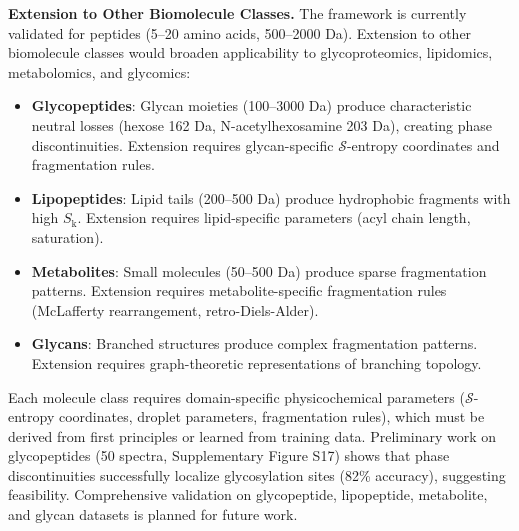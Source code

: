 \documentclass[11pt,twocolumn]{article}
\newcommand{\sentropy}{$\mathcal{S}$-entropy}
\newcommand{\Sk}{S_{\text{k}}}
\begin{document}
\textbf{Extension to Other Biomolecule Classes.} The framework is currently validated for peptides (5--20 amino acids, 500--2000 Da). Extension to other biomolecule classes would broaden applicability to glycoproteomics, lipidomics, metabolomics, and glycomics:
\begin{itemize}[leftmargin=*]
    \item \textbf{Glycopeptides}: Glycan moieties (100--3000 Da) produce characteristic neutral losses (hexose 162 Da, N-acetylhexosamine 203 Da), creating phase discontinuities. Extension requires glycan-specific \sentropy{} coordinates and fragmentation rules.
    \item \textbf{Lipopeptides}: Lipid tails (200--500 Da) produce hydrophobic fragments with high $\Sk$. Extension requires lipid-specific parameters (acyl chain length, saturation).
    \item \textbf{Metabolites}: Small molecules (50--500 Da) produce sparse fragmentation patterns. Extension requires metabolite-specific fragmentation rules (McLafferty rearrangement, retro-Diels-Alder).
    \item \textbf{Glycans}: Branched structures produce complex fragmentation patterns. Extension requires graph-theoretic representations of branching topology.
\end{itemize}
Each molecule class requires domain-specific physicochemical parameters (\sentropy{} coordinates, droplet parameters, fragmentation rules), which must be derived from first principles or learned from training data. Preliminary work on glycopeptides (50 spectra, Supplementary Figure S17) shows that phase discontinuities successfully localize glycosylation sites (82\% accuracy), suggesting feasibility. Comprehensive validation on glycopeptide, lipopeptide, metabolite, and glycan datasets is planned for future work.
\end{document}
